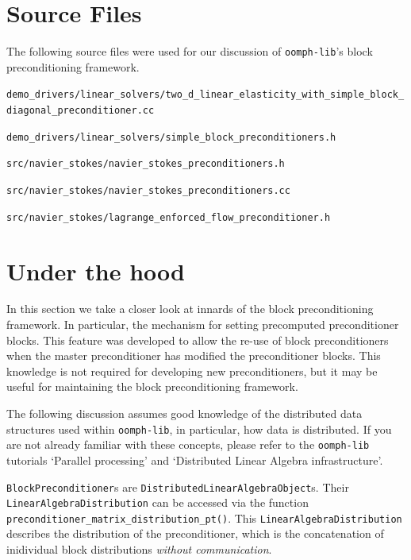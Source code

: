 \section{Source Files\label{sec:source_files}}
The following source files were used for our discussion of \verb+oomph-lib+'s block preconditioning framework.

\noindent
{\scriptsize
\verb+demo_drivers/linear_solvers/two_d_linear_elasticity_with_simple_block_diagonal_preconditioner.cc+
}

\noindent
{\scriptsize
\verb+demo_drivers/linear_solvers/simple_block_preconditioners.h+
}

\noindent
{\scriptsize
\verb+src/navier_stokes/navier_stokes_preconditioners.h+
}

\noindent
{\scriptsize
\verb+src/navier_stokes/navier_stokes_preconditioners.cc+
}

\noindent
{\scriptsize
\verb+src/navier_stokes/lagrange_enforced_flow_preconditioner.h+
}

\section{Under the hood\label{sec:under_the_hood}}
In this section we take a closer look at innards of the block preconditioning framework. In particular, the mechanism for setting precomputed preconditioner blocks. This feature was developed to allow the re-use of block preconditioners when the master preconditioner has modified the preconditioner blocks. This knowledge is not required for developing new preconditioners, but it may be useful for maintaining the block preconditioning framework.

The following discussion assumes good knowledge of the distributed data structures used within \verb+oomph-lib+, in particular, how data is distributed. If you are not already familiar with these concepts, please refer to the \verb+oomph-lib+ tutorials `Parallel processing' and `Distributed Linear Algebra infrastructure'.

\texttt{Block\-Preconditioner}s are \texttt{Distributed\-Linear\-Algebra\-Object}s. Their \texttt{Linear\-Algebra\-Distribution} can be accessed via the function \texttt{preconditioner\-\_matrix\-\_distribution\-\_pt()}. This \texttt{Linear\-Algebra\-Distribution} describes the distribution of the preconditioner, which is the concatenation of inidividual block distributions \emph{without communication}.

